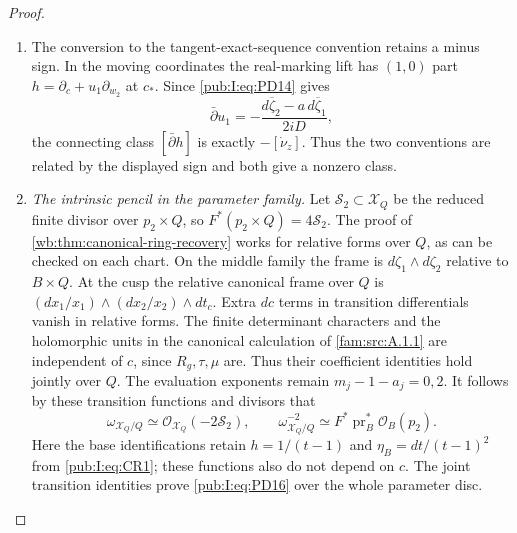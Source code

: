 \begin{proof}
\begin{enumerate}[label=\arabic*.,leftmargin=*]
\item The conversion to the tangent-exact-sequence convention retains a
minus sign. In the moving coordinates the real-marking lift has
$(1,0)$ part $h=\partial_c+u_1\partial_{w_2}$ at $c_*$.
Since \eqref{pub:I:eq:PD14} gives
\[
 \bar\partial u_1=-\frac{d\overline\zeta_2-a\,d\overline\zeta_1}{2iD},
\]
the connecting class $[\bar\partial h]$ is exactly $-[\dot\nu_z]$.
Thus the two conventions are related by the displayed sign and both give a nonzero class.

\item \emph{The intrinsic pencil in the parameter family.}
Let $\mathcal S_2\subset\mathcal X_Q$ be the reduced finite divisor
over $p_2\times Q$, so $F^*(p_2\times Q)=4\mathcal S_2$.
The proof of \cref{wb:thm:canonical-ring-recovery} works for relative
forms over $Q$, as can be checked on each chart.
On the middle family the frame is $d\zeta_1\wedge d\zeta_2$ relative
to $B\times Q$. At the cusp the relative canonical frame over $Q$ is
$(dx_1/x_1)\wedge(dx_2/x_2)\wedge dt_c$.
Extra $dc$ terms in transition differentials vanish in relative forms.
The finite determinant characters and the holomorphic units in
the canonical calculation of \cref{fam:src:A.1.1} are independent
of $c$, since $R_g,\tau,\mu$ are.
Thus their coefficient identities hold jointly over $Q$.
The evaluation exponents remain $m_j-1-a_j=0,2$.
It follows by these transition functions and divisors that
\begin{equation}
 \omega_{\mathcal X_Q/Q}\simeq\mathcal O_{\mathcal X_Q}(-2\mathcal S_2),
 \qquad
 \omega_{\mathcal X_Q/Q}^{-2}\simeq
          F^*\operatorname{pr}_B^*\mathcal O_B(p_2).
\label{pub:I:eq:PD16}
\end{equation}
Here the base identifications retain $h=1/(t-1)$ and
$\eta_B=dt/(t-1)^2$ from \eqref{pub:I:eq:CR1}; these functions also do not depend on $c$.
The joint transition identities prove \eqref{pub:I:eq:PD16} over the whole parameter disc.


\end{enumerate}
\end{proof}
